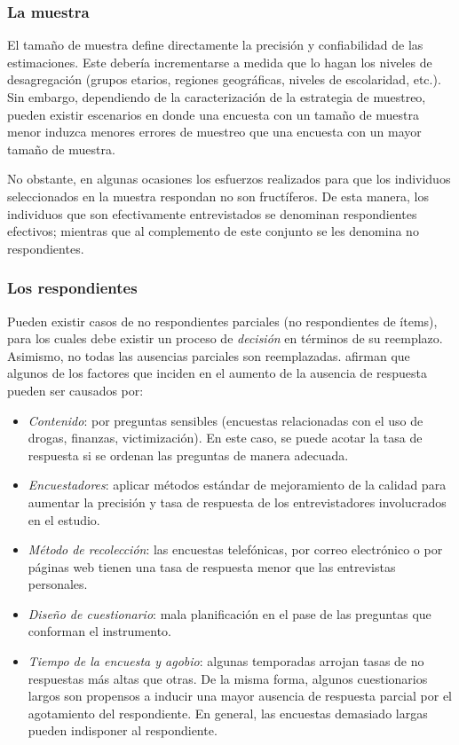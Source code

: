 \documentclass[
  12pt,
]{book}
\providecommand{\tightlist}{%
  \setlength{\itemsep}{0pt}\setlength{\parskip}{0pt}}
\begin{document}
\hypertarget{la-muestra}{%
\subsubsection{La muestra}\label{la-muestra}}

El tamaño de muestra define directamente la precisión y confiabilidad de las estimaciones. Este debería incrementarse a medida que lo hagan los niveles de desagregación (grupos etarios, regiones geográficas, niveles de escolaridad, etc.). Sin embargo, dependiendo de la caracterización de la estrategia de muestreo, pueden existir escenarios en donde una encuesta con un tamaño de muestra menor induzca menores errores de muestreo que una encuesta con un mayor tamaño de muestra.

No obstante, en algunas ocasiones los esfuerzos realizados para que los individuos seleccionados en la muestra respondan no son fructíferos. De esta manera, los individuos que son efectivamente entrevistados se denominan respondientes efectivos; mientras que al complemento de este conjunto se les denomina no respondientes.

\hypertarget{los-respondientes}{%
\subsubsection{Los respondientes}\label{los-respondientes}}

Pueden existir casos de no respondientes parciales (no respondientes de ítems), para los cuales debe existir un proceso de \emph{decisión} en términos de su reemplazo. Asimismo, no todas las ausencias parciales son reemplazadas. \citet{Groves_Fowler_Couper_Lepkowski_Singer_Tourangeau_2009} afirman que algunos de los factores que inciden en el aumento de la ausencia de respuesta pueden ser causados por:

\begin{itemize}
\tightlist
\item
  \emph{Contenido}: por preguntas sensibles (encuestas relacionadas con el uso de drogas, finanzas, victimización). En este caso, se puede acotar la tasa de respuesta si se ordenan las preguntas de manera adecuada.
\item
  \emph{Encuestadores}: aplicar métodos estándar de mejoramiento de la calidad para aumentar la precisión y tasa de respuesta de los entrevistadores involucrados en el estudio.
\item
  \emph{Método de recolección}: las encuestas telefónicas, por correo electrónico o por páginas web tienen una tasa de respuesta menor que las entrevistas personales.
\item
  \emph{Diseño de cuestionario}: mala planificación en el pase de las preguntas que conforman el instrumento.
\item
  \emph{Tiempo de la encuesta y agobio}: algunas temporadas arrojan tasas de no respuestas más altas que otras. De la misma forma, algunos cuestionarios largos son propensos a inducir una mayor ausencia de respuesta parcial por el agotamiento del respondiente. En general, las encuestas demasiado largas pueden indisponer al respondiente.
\end{itemize}
\end{document}
